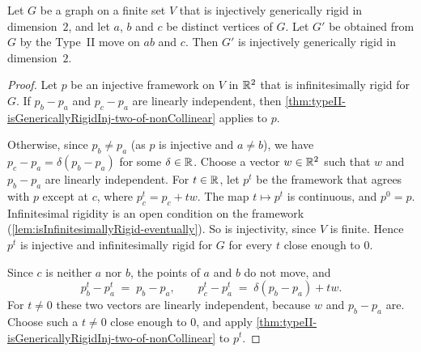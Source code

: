 \begin{theorem}
  \label{thm:typeII-isGenericallyRigidInj-two}
  \leanok
  Let $G$ be a graph on a finite set $V$ that is injectively
  generically rigid in dimension~$2$, and let $a$, $b$ and $c$ be
  distinct vertices of $G$. Let $G'$ be obtained from $G$ by the
  Type~II move on $ab$ and $c$. Then $G'$ is injectively generically
  rigid in dimension~$2$.
\end{theorem}
\begin{proof}
  \leanok
  Let $p$ be an injective framework on $V$ in ${\mathbb{R}}^{2}$ that is
  infinitesimally rigid for $G$. If $p_b - p_a$ and $p_c - p_a$ are
  linearly independent, then
  \cref{thm:typeII-isGenericallyRigidInj-two-of-nonCollinear} applies
  to $p$.

  Otherwise, since $p_b \ne p_a$ (as $p$ is injective and $a \ne b$),
  we have
  $p_c - p_a = \delta (p_b - p_a)$ for some $\delta \in {\mathbb{R}}$. Choose a
  vector $w \in {\mathbb{R}}^{2}$ such that $w$ and $p_b - p_a$ are linearly
  independent. For $t \in {\mathbb{R}}$, let $p^t$ be the framework that agrees
  with $p$ except at $c$, where $p^t_c = p_c + t w$. The map
  $t \mapsto p^t$ is continuous, and $p^0 = p$. Infinitesimal rigidity
  is an open condition on the framework
  (\cref{lem:isInfinitesimallyRigid-eventually}). So is injectivity,
  since $V$ is finite. Hence $p^t$ is injective and infinitesimally
  rigid for $G$ for every $t$ close enough to $0$.

  Since $c$ is neither $a$ nor $b$, the points of $a$ and $b$ do not
  move, and
  \[
    p^t_b - p^t_a \;=\; p_b - p_a, \qquad
    p^t_c - p^t_a \;=\; \delta (p_b - p_a) + t w.
  \]
  For $t \ne 0$ these two vectors are linearly independent, because
  $w$ and $p_b - p_a$ are. Choose such a $t \ne 0$ close enough to
  $0$, and apply
  \cref{thm:typeII-isGenericallyRigidInj-two-of-nonCollinear} to
  $p^t$.
\end{proof}
